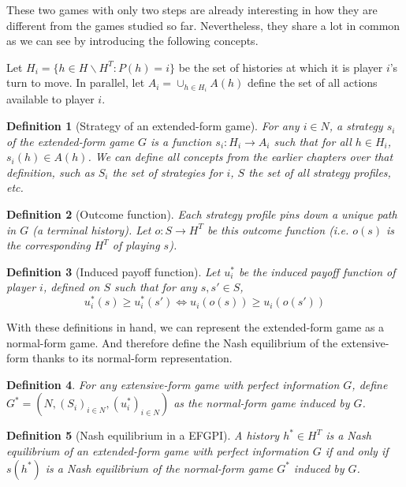 \documentclass[12pt]{report}
\newtheorem{definition}{Definition}[chapter]
\begin{document}
These two games with only two steps are already interesting in how they are different from the games studied so far. Nevertheless, they share a lot in common as we can see by introducing the following concepts.

Let $H_i = \{h\in H\backslash H^T : P(h) = i\}$ be the set of histories at which it is player $i$'s turn to move. In parallel, let $A_i = \cup_{h\in H_i}A(h)$ define the set of all actions available to player $i$.

\begin{definition}[Strategy of an extended-form game]
For any $i\in N$, a strategy $s_i$ of the extended-form game $G$ is a function $s_i:H_i\to A_i$ such that for all $h\in H_i$, $s_i(h) \in A(h)$. We can define all concepts from the earlier chapters over that definition, such as $S_i$ the set of strategies for $i$, $S$ the set of all strategy profiles, etc.
\end{definition}

\begin{definition}[Outcome function]
Each strategy profile pins down a unique path in $G$ (a terminal history). Let $o:S\to H^T$ be this outcome function (i.e. $o(s)$ is the corresponding $H^T$ of playing $s$).
\end{definition}

\begin{definition}[Induced payoff function]
Let $u_i^*$ be the induced payoff function of player $i$, defined on $S$ such that for any $s,s'\in S$, $$ u_i^*(s)\geq u_i^*(s') \Leftrightarrow u_i(o(s))\geq u_i(o(s')) $$
\end{definition}

With these definitions in hand, we can represent the extended-form game as a normal-form game. And therefore define the Nash equilibrium of the extensive-form thanks to its normal-form representation.

\begin{definition}
For any extensive-form game with perfect information $G$, define $G^* = (N, (S_i)_{i\in N}, (u_i^*)_{i\in N})$ as the normal-form game induced by $G$.
\end{definition}

\begin{definition}[Nash equilibrium in a EFGPI]
A history $h^*\in H^T$ is a Nash equilibrium of an extended-form game with perfect information $G$ if and only if $s(h^*)$ is a Nash equilibrium of the normal-form game $G^*$ induced by $G$.
\end{definition}
\end{document}
